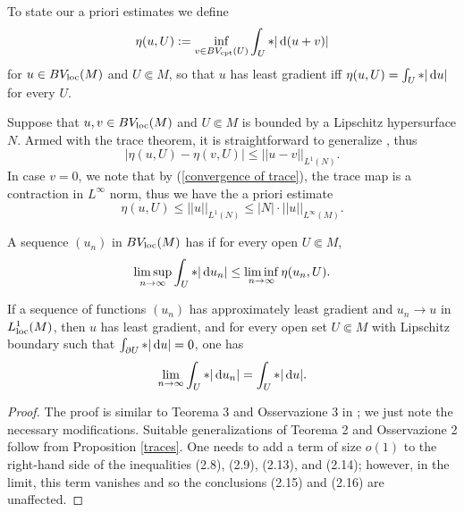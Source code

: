 To state our a priori estimates we define
$$\eta(u, U) := \inf_{v \in BV_{\mathrm{cpt}}(U)} \int_U *|\mathop{}\!\mathrm{d}(u + v)|$$
for $u \in BV_{\mathrm{loc}}(M)$ and $U \Subset M$, so that $u$ has least gradient iff $\eta(u, U) = \int_U *|\mathop{}\!\mathrm{d} u|$ for every $U$.

Suppose that $u, v \in BV_{\mathrm{loc}}(M)$ and $U \Subset M$ is bounded by a Lipschitz hypersurface $N$. Armed with the trace theorem, it is straightforward to generalize \cite[Lemma 5.6]{Giusti77}, thus
\begin{equation}
|\eta(u, U) - \eta(v, U)| \leq ||u - v||_{L^1(N)}. \label{a priori estimate 1}
\end{equation}
In case $v = 0$, we note that by (\ref{convergence of trace}), the trace map is a contraction in $L^\infty$ norm, thus we have the a priori estimate
\begin{equation}
\eta(u, U) \leq ||u||_{L^1(N)} \leq |N| \cdot ||u||_{L^\infty(M)}. \label{a priori estimate 2}
\end{equation}

\begin{definition}
A sequence $(u_n)$ in $BV_{\mathrm{loc}}(M)$ has  if for every open $U \Subset M$,
$$\limsup_{n \to \infty} \int_U *|\mathop{}\!\mathrm{d} u_n| \leq \liminf_{n \to \infty} \eta(u_n, U).$$
\end{definition}

\begin{proposition}\label{Miranda convergence}
If a sequence of functions $(u_n)$ has approximately least gradient and $u_n \to u$ in $L^1_{\mathrm{loc}}(M)$, then $u$ has least gradient, and for every open set $U \Subset M$ with Lipschitz boundary such that $\int_{\partial U} *|\mathop{}\!\mathrm{d} u| = 0$, one has
\begin{equation}\label{convergence in total variation}
\lim_{n \to \infty} \int_U *|\mathop{}\!\mathrm{d} u_n| = \int_U *|\mathop{}\!\mathrm{d} u|.
\end{equation}
\end{proposition}
\begin{proof}
The proof is similar to Teorema 3 and Osservazione 3 in \cite{Miranda67}; we just note the necessary modifications.
Suitable generalizations of Teorema 2 and Osservazione 2 follow from Proposition \ref{traces}.
One needs to add a term of size $o(1)$ to the right-hand side of the inequalities (2.8), (2.9), (2.13), and (2.14); however, in the limit, this term vanishes and so the conclusions (2.15) and (2.16) are unaffected.
\end{proof}

